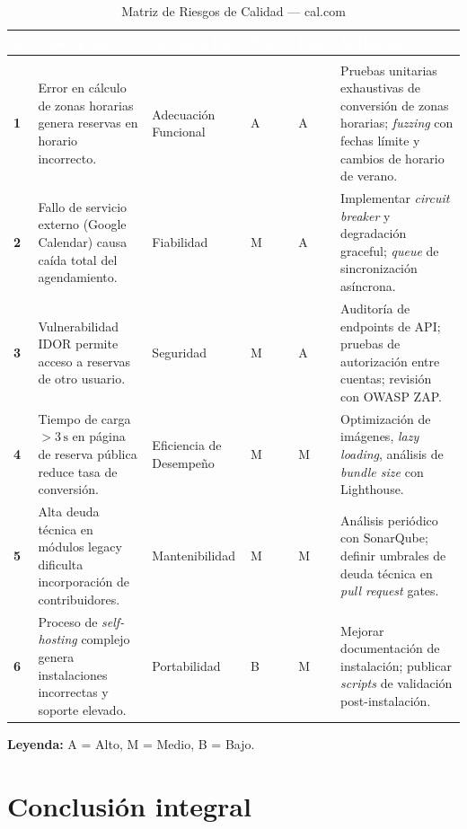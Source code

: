 \documentclass[12pt, a4paper]{article}
\newcommand{\rowpair}{\rowcolor{grisMedio}}
\newcommand{\rowimpar}{\rowcolor{grisClaro}}
\begin{document}
\begin{longtable}{>{\bfseries\centering}p{0.5cm} p{3.8cm} p{2.5cm} p{1cm} p{1cm} p{4cm}}
\caption{Matriz de Riesgos de Calidad — cal.com} \label{tab:riesgos} \\
\rowcolor{azulUPA}
\textcolor{white}{\textbf{\#}} &
\textcolor{white}{\textbf{Descripción}} &
\textcolor{white}{\textbf{Atributo ISO}} &
\textcolor{white}{\textbf{Prob.}} &
\textcolor{white}{\textbf{Imp.}} &
\textcolor{white}{\textbf{Mitigación}} \\
\endfirsthead
\multicolumn{6}{c}{\tablename\ \thetable{} -- continuación} \\
\endhead
\rowpair
1 & Error en cálculo de zonas horarias genera reservas en horario incorrecto. &
Adecuación Funcional & A & A &
Pruebas unitarias exhaustivas de conversión de zonas horarias; \textit{fuzzing} con fechas límite y cambios de horario de verano. \\
\rowimpar
2 & Fallo de servicio externo (Google Calendar) causa caída total del agendamiento. &
Fiabilidad & M & A &
Implementar \textit{circuit breaker} y degradación graceful; \textit{queue} de sincronización asíncrona. \\
\rowpair
3 & Vulnerabilidad IDOR permite acceso a reservas de otro usuario. &
Seguridad & M & A &
Auditoría de endpoints de API; pruebas de autorización entre cuentas; revisión con OWASP ZAP. \\
\rowimpar
4 & Tiempo de carga $> 3\,\text{s}$ en página de reserva pública reduce tasa de conversión. &
Eficiencia de Desempeño & M & M &
Optimización de imágenes, \textit{lazy loading}, análisis de \textit{bundle size} con Lighthouse. \\
\rowpair
5 & Alta deuda técnica en módulos legacy dificulta incorporación de contribuidores. &
Mantenibilidad & M & M &
Análisis periódico con SonarQube; definir umbrales de deuda técnica en \textit{pull request} gates. \\
\rowimpar
6 & Proceso de \textit{self-hosting} complejo genera instalaciones incorrectas y soporte elevado. &
Portabilidad & B & M &
Mejorar documentación de instalación; publicar \textit{scripts} de validación post-instalación. \\
\end{longtable}

\noindent\textbf{Leyenda:} A = Alto, M = Medio, B = Bajo.

\section{Conclusión integral}
\end{document}
